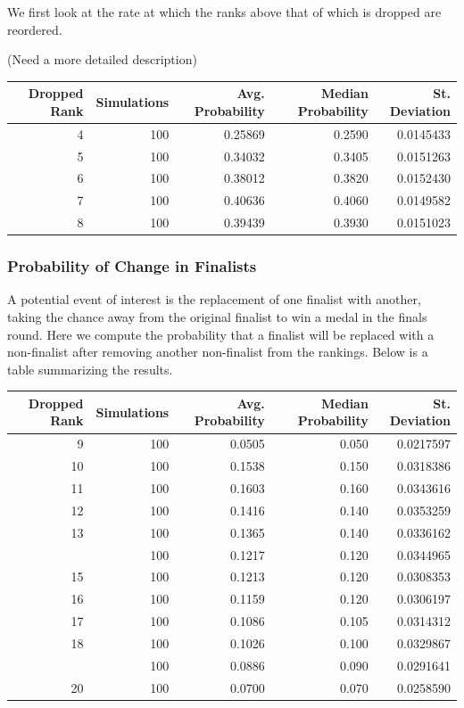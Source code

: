 \documentclass[12pt]{article}
\begin{document}
We first look at the rate at which the ranks above that of which is
dropped are reordered.

(Need a more detailed description)

\begin{tabular}{rrrrr}
\toprule
Dropped Rank & Simulations & Avg. Probability & Median Probability & St. Deviation\\
\midrule
4 & 100 & 0.25869 & 0.2590 & 0.0145433\\
5 & 100 & 0.34032 & 0.3405 & 0.0151263\\
6 & 100 & 0.38012 & 0.3820 & 0.0152430\\
7 & 100 & 0.40636 & 0.4060 & 0.0149582\\
8 & 100 & 0.39439 & 0.3930 & 0.0151023\\
\bottomrule
\end{tabular}

\hypertarget{probability-of-change-in-finalists}{%
\subsubsection{Probability of Change in
Finalists}\label{probability-of-change-in-finalists}}

A potential event of interest is the replacement of one finalist with
another, taking the chance away from the original finalist to win a
medal in the finals round. Here we compute the probability that a
finalist will be replaced with a non-finalist after removing another
non-finalist from the rankings. Below is a table summarizing the
results.

\begin{tabular}{rrrrr}
\toprule
Dropped Rank & Simulations & Avg. Probability & Median Probability & St. Deviation\\
\midrule
9 & 100 & 0.0505 & 0.050 & 0.0217597\\
10 & 100 & 0.1538 & 0.150 & 0.0318386\\
11 & 100 & 0.1603 & 0.160 & 0.0343616\\
12 & 100 & 0.1416 & 0.140 & 0.0353259\\
13 & 100 & 0.1365 & 0.140 & 0.0336162\\
\addlinespace
14 & 100 & 0.1217 & 0.120 & 0.0344965\\
15 & 100 & 0.1213 & 0.120 & 0.0308353\\
16 & 100 & 0.1159 & 0.120 & 0.0306197\\
17 & 100 & 0.1086 & 0.105 & 0.0314312\\
18 & 100 & 0.1026 & 0.100 & 0.0329867\\
\addlinespace
19 & 100 & 0.0886 & 0.090 & 0.0291641\\
20 & 100 & 0.0700 & 0.070 & 0.0258590\\
\bottomrule
\end{tabular}
\end{document}
